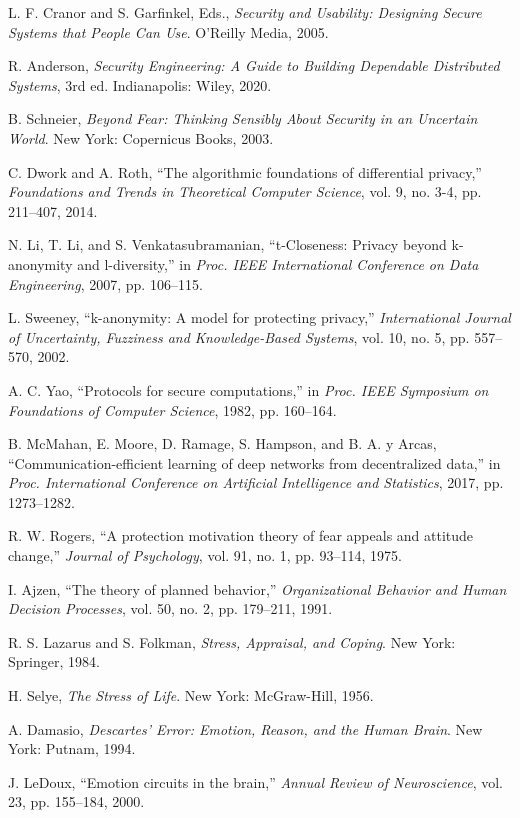 \documentclass[10pt,twocolumn]{IEEEtran}
\begin{document}
\begin{thebibliography}{99}
L. F. Cranor and S. Garfinkel, Eds., \emph{Security and Usability: Designing Secure Systems that People Can Use}. O'Reilly Media, 2005.

R. Anderson, \emph{Security Engineering: A Guide to Building Dependable Distributed Systems}, 3rd ed. Indianapolis: Wiley, 2020.

B. Schneier, \emph{Beyond Fear: Thinking Sensibly About Security in an Uncertain World}. New York: Copernicus Books, 2003.

C. Dwork and A. Roth, ``The algorithmic foundations of differential privacy,'' \emph{Foundations and Trends in Theoretical Computer Science}, vol. 9, no. 3-4, pp. 211--407, 2014.

N. Li, T. Li, and S. Venkatasubramanian, ``t-Closeness: Privacy beyond k-anonymity and l-diversity,'' in \emph{Proc. IEEE International Conference on Data Engineering}, 2007, pp. 106--115.

L. Sweeney, ``k-anonymity: A model for protecting privacy,'' \emph{International Journal of Uncertainty, Fuzziness and Knowledge-Based Systems}, vol. 10, no. 5, pp. 557--570, 2002.

A. C. Yao, ``Protocols for secure computations,'' in \emph{Proc. IEEE Symposium on Foundations of Computer Science}, 1982, pp. 160--164.

B. McMahan, E. Moore, D. Ramage, S. Hampson, and B. A. y Arcas, ``Communication-efficient learning of deep networks from decentralized data,'' in \emph{Proc. International Conference on Artificial Intelligence and Statistics}, 2017, pp. 1273--1282.

R. W. Rogers, ``A protection motivation theory of fear appeals and attitude change,'' \emph{Journal of Psychology}, vol. 91, no. 1, pp. 93--114, 1975.

I. Ajzen, ``The theory of planned behavior,'' \emph{Organizational Behavior and Human Decision Processes}, vol. 50, no. 2, pp. 179--211, 1991.

R. S. Lazarus and S. Folkman, \emph{Stress, Appraisal, and Coping}. New York: Springer, 1984.

H. Selye, \emph{The Stress of Life}. New York: McGraw-Hill, 1956.

A. Damasio, \emph{Descartes' Error: Emotion, Reason, and the Human Brain}. New York: Putnam, 1994.

J. LeDoux, ``Emotion circuits in the brain,'' \emph{Annual Review of Neuroscience}, vol. 23, pp. 155--184, 2000.

\end{thebibliography}
\end{document}
